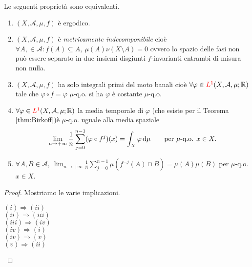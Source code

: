 \begin{thm}
    Le seguenti proprietà sono equivalenti.
    \begin{enumerate}[label=(\roman*)]
        \item $ (X, \mathcal{A}, \mu, f) $ è ergodico.
        \item $ (X, \mathcal{A}, \mu, f) $ è \emph{metricamente indecomponibile} cioè $ \forall A, \in \mathcal{A} : f(A) \subseteq A, \ \mu(A) \nu(X \setminus A) = 0 $ ovvero lo spazio delle fasi non può essere separato in due insiemi disgiunti $ f $-invarianti entrambi di misura non nulla. 
        \item $ (X, \mathcal{A}, \mu, f) $ ha solo integrali primi del moto banali cioè $ \forall \varphi \in \textcolor{red}{L^1}(X, \mathcal{A}, \mu; \mathbb{R}) $ tale che $ \varphi \circ f = \varphi $ $ \mu $-q.o. si ha $ \varphi $ è costante $ \mu $-q.o.
        \item $ \forall \varphi \in \textcolor{red}{L^1}(X, \mathcal{A}, \mu; \mathbb{R}) $ la media temporale di $ \varphi $ (che esiste per il Teorema \ref{thm:Birkoff})è $ \mu $-q.o. uguale alla media spaziale 
        \[
            \lim_{n \to +\infty} \frac{1}{n} \sum_{j=0}^{n-1} (\varphi \circ f^j)(x) = \int_{X} \varphi \dif{\mu} \qquad \text{per } \mu\text{-q.o. } x \in X.
        \]
        \item $ \forall A, B \in \mathcal{A}, \ \displaystyle{\lim_{n \to +\infty} \frac{1}{n} \sum_{j=0}^{n-1} \mu(f^{-j}(A) \cap B) = \mu(A) \mu(B)} $ per $ \mu $-q.o. $ x \in X $. 
    \end{enumerate}
\end{thm}
\begin{proof}
    Mostriamo le varie implicazioni.
    \begin{description}
        \item[$ (i) \Rightarrow (ii) $] 
        \item[$ (ii) \Rightarrow (iii) $] 
        \item[$ (iii) \Rightarrow (iv) $] 
        \item[$ (iv) \Rightarrow (i) $] 
        \item[$ (iv) \Rightarrow (v) $] 
        \item[$ (v) \Rightarrow (ii) $] 
    \end{description}
\end{proof}

